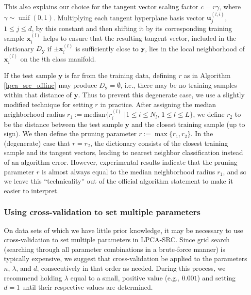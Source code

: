 \documentclass[review]{elsarticle}
\newcommand{\unif}{\operatorname{unif}}
\begin{document}
This also explains our choice for the tangent vector scaling factor $c = r \gamma$, where $\gamma \sim \unif(0,1)$. Multiplying each tangent hyperplane basis vector $\bm{u}_j^{(l,i)}$, $1\leq j \leq d$, by this constant and then shifting it by its corresponding training sample $\bm{x}_i^{(l)}$ helps to ensure that the resulting tangent vector, included in the dictionary $D_{\bm{y}}$ if $\pm\bm{x}_i^{(l)}$ is sufficiently close to $\bm{y}$, lies in the local neighborhood of $\bm{x}_i^{(l)}$ on the $l$th class manifold.

\begin{rem}
If the test sample $\bm{y}$ is far from the training data, defining $r$ as in Algorithm \ref{lpca_src_offline} may produce $D_{\bm{y}} = \emptyset$, i.e., there may be no training samples within that distance of $\bm{y}$. Thus to prevent this degenerate case, we use a slightly modified technique for setting $r$ in practice. After assigning the median neighborhood radius $r_1 := \mathrm{median} \big\{ r_i^{(l)}\, | \, 1\leq i \leq N_l, \, 1\leq l \leq L \big\}$, we define $r_2$ to be the distance between the test sample $\bm{y}$ and the closest training sample (up to sign). We then define the pruning parameter $r := \max\{r_1,r_2\}$. In the (degenerate) case that $r=r_2$, the dictionary consists of the closest training sample and its tangent vectors, leading to nearest neighbor classification instead of an algorithm error. However, experimental results indicate that the pruning parameter $r$ is almost always equal to the median neighborhood radius $r_1$, and so we leave this ``technicality'' out of the official algorithm statement to make it easier to interpret.
\end{rem}


\subsubsection{Using cross-validation to set multiple parameters} \label{sec:par_set}

On data sets of which we have little prior knowledge, it may be necessary to use cross-validation to set multiple parameters in LPCA-SRC. Since grid search (searching through all parameter combinations in a brute-force manner) is typically expensive, we suggest that cross-validation be applied to the parameters $n$, $\lambda$, and $d$, consecutively in that order as needed. During this process, we recommend holding $\lambda$ equal to a small, positive value (e.g., $0.001$) and setting $d=1$ until their respective values are determined.
\end{document}
